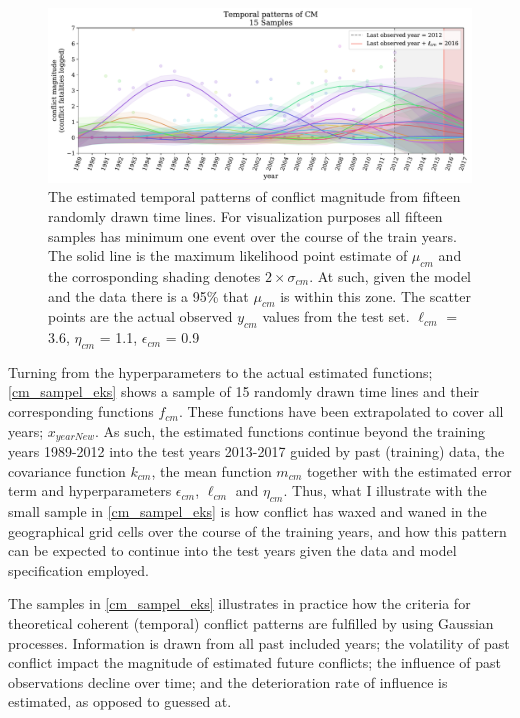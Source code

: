 \documentclass[a4paper]{article}
\begin{document}
\begin{figure}[!htb]
	\centering
	\includegraphics[scale=0.47]{cm_15_samples.pdf}
    \caption{\footnotesize{The estimated temporal patterns of conflict magnitude from fifteen randomly drawn time lines. For visualization purposes all fifteen samples has minimum one event over the course of the train years. The solid line is the maximum likelihood point estimate of $\mu_{cm}$ and the corrosponding shading denotes $2\times\sigma_{cm}$. At such, given the model and the data there is a 95\% that $\mu_{cm}$ is within this zone. The scatter points are the actual observed $y_{cm}$ values from the test set. $\ell_{cm}$ = 3.6, $\eta_{cm}$ = 1.1, $\epsilon_{cm}$ = 0.9}\label{cm_sampel_eks}}
\end{figure}

Turning from the hyperparameters to the actual estimated functions; \autoref{cm_sampel_eks} shows a sample of 15 randomly drawn time lines and their corresponding functions $f_{cm}$. These functions have been extrapolated to cover all years; $x_{yearNew}$. As such, the estimated functions continue beyond the training years 1989-2012 into the test years 2013-2017 guided by past (training) data, the covariance function $k_{cm}$, the mean function $m_{cm}$ together with the estimated error term and hyperparameters $\epsilon_{cm}$, $\ell_{cm}$ and $\eta_{cm}$. Thus, what I illustrate with the small sample in \autoref{cm_sampel_eks} is how conflict has waxed and waned in the geographical grid cells over the course of the training years, and how this pattern can be expected to continue into the test years given the data and model specification employed.\par 

The samples in \autoref{cm_sampel_eks} illustrates in practice how the criteria for theoretical coherent (temporal) conflict patterns are fulfilled by using Gaussian processes. Information is drawn from all past included years; the volatility of past conflict impact the magnitude of estimated future conflicts; the influence of past observations decline over time; and the deterioration rate of influence is estimated, as opposed to guessed at.\par
\end{document}
